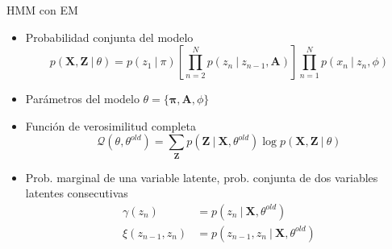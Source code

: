 \documentclass[10pt]{beamer}
\begin{document}
\begin{frame}{HMM con EM}
  \begin{itemize}
    \item Probabilidad conjunta del modelo
      \begin{equation}
        p(\mathbf{X}, \mathbf{Z} ~|~ \theta)        
          = p(z_1 ~|~ \pi) \left[ \prod_{n=2}^N p(z_n ~|~ z_{n-1}, \mathbf{A}) \right]
          \prod_{n=1}^N p(x_n ~|~ z_n, \phi)
      \end{equation}
      
      \item Parámetros del modelo $\theta = \lbrace \bm{\pi}, \mathbf{A}, \phi \rbrace$
      
      \item Función de verosimilitud completa
        \begin{equation}
          \mathcal{Q}(\theta, \theta^{old}) = \sum_{\mathbf{Z}} p(\mathbf{Z} ~|~ \mathbf{X}, \theta^{old})
              \log p(\mathbf{X}, \mathbf{Z} ~|~ \theta)
        \end{equation}
        
      \item Prob. marginal de una variable latente, prob. conjunta de dos variables latentes consecutivas
        \begin{align}
          \gamma(z_n) &= p(z_n ~|~ \mathbf{X}, \theta^{old}) \\
          \xi(z_{n-1}, z_n) &= p(z_{n-1}, z_n ~|~ \mathbf{X}, \theta^{old})
        \end{align}
  \end{itemize}
\end{frame}
\end{document}
